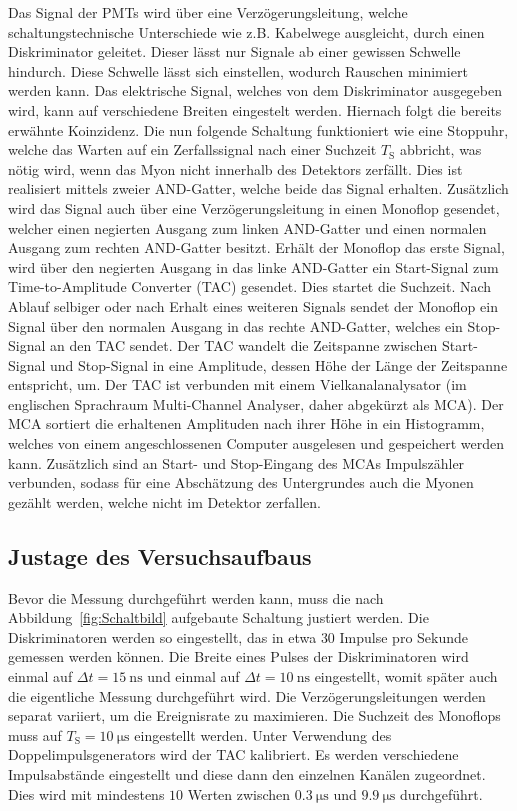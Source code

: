 \noindent
Das Signal der PMTs wird über eine Verzögerungsleitung, welche schaltungstechnische Unterschiede
wie z.B. Kabelwege ausgleicht, durch einen Diskriminator geleitet. Dieser lässt nur Signale ab
einer gewissen Schwelle hindurch. Diese Schwelle lässt sich einstellen, wodurch Rauschen
minimiert werden kann. Das elektrische Signal, welches von dem Diskriminator ausgegeben wird,
kann auf verschiedene Breiten eingestelt werden. Hiernach folgt die bereits erwähnte Koinzidenz.
Die nun folgende Schaltung funktioniert wie eine Stoppuhr, welche das Warten auf ein Zerfallssignal
nach einer Suchzeit $T_{\text{S}}$ abbricht, was nötig wird, wenn das Myon nicht innerhalb des Detektors
zerfällt. Dies ist realisiert mittels zweier AND-Gatter, welche beide das Signal erhalten. Zusätzlich
wird das Signal auch über eine Verzögerungsleitung in einen Monoflop gesendet, welcher einen negierten
Ausgang zum linken AND-Gatter und einen normalen Ausgang zum rechten AND-Gatter besitzt. Erhält der
Monoflop das erste Signal, wird über den negierten Ausgang in das linke AND-Gatter ein Start-Signal zum
Time-to-Amplitude Converter (TAC) gesendet. Dies startet die Suchzeit. Nach Ablauf selbiger oder
nach Erhalt eines weiteren Signals sendet der Monoflop ein Signal über den normalen Ausgang in
das rechte AND-Gatter, welches ein Stop-Signal an den TAC sendet.
Der TAC wandelt die Zeitspanne zwischen Start-Signal und Stop-Signal in eine Amplitude, dessen Höhe der
Länge der Zeitspanne entspricht, um.
Der TAC ist verbunden mit einem Vielkanalanalysator (im englischen Sprachraum Multi-Channel Analyser, daher abgekürzt als MCA).
Der MCA sortiert die erhaltenen Amplituden nach ihrer Höhe in ein Histogramm, welches von einem
angeschlossenen Computer ausgelesen und gespeichert werden kann.
Zusätzlich sind an Start- und Stop-Eingang des MCAs Impulszähler verbunden, sodass für eine Abschätzung
des Untergrundes auch die Myonen gezählt werden, welche nicht im Detektor zerfallen.
\subsection{Justage des Versuchsaufbaus}
\label{JustageVersuchsaufbau}
Bevor die Messung durchgeführt werden kann, muss die nach Abbildung~\ref{fig:Schaltbild} aufgebaute Schaltung justiert
werden. Die Diskriminatoren werden so eingestellt, das in etwa $30$ Impulse pro Sekunde gemessen werden können.
Die Breite eines Pulses der Diskriminatoren wird einmal auf $\Delta t = \SI{15}{\nano\second}$ und einmal auf $\Delta t = \SI{10}{\nano\second}$
eingestellt, womit später auch die eigentliche Messung durchgeführt wird. Die Verzögerungsleitungen werden separat
variiert, um die Ereignisrate zu maximieren. Die Suchzeit des Monoflops muss auf $T_{\text{S}} = \SI{10}{\micro\second} $ eingestellt werden.
Unter Verwendung des Doppelimpulsgenerators wird der TAC kalibriert. Es werden verschiedene Impulsabstände eingestellt
und diese dann den einzelnen Kanälen zugeordnet. Dies wird mit mindestens $10$ Werten zwischen $\SI{0.3}{\micro\second}$
und $\SI{9.9}{\micro\second}$ durchgeführt.
